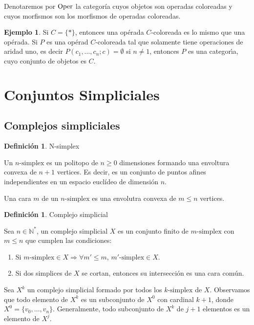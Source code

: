 \documentclass[11pt,a4paper,openright,oneside]{article}
\numberwithin{equation}{section}
\theoremstyle{definition}
\newtheorem{defi}[teo]{Definici\'on}
\newtheorem{ex}[teo]{Ejemplo}
\newcommand{\Oper}{\mathop{\rm Oper}}
\begin{document}
Denotaremos por $\Oper$ la categor\'ia cuyos objetos son operadas coloreadas y cuyos morfismos son los morfismos de operadas coloreadas.

\begin{ex}
    Si $C=\{*\}$, entonces una op\'erada $C$-coloreada es lo mismo que una op\'erada. Si $P$ es una op\'erad $C$-coloreada tal que solamente tiene operaciones de aridad uno, es decir $P(c_1,\ldots, c_n;c)=\emptyset$ si $n\ne 1$, entonces $P$ es una categor\'{\i}a, cuyo conjunto de objetos es $C$.
\end{ex}
\newpage


\section{Conjuntos Simpliciales}
\subsection{Complejos simpliciales}
\begin{defi}
    N-simplex
\end{defi}
Un $n\text{-simplex}$ es un politopo de $n\ge 0$ dimensiones formando una envoltura convexa de $n+1$ vertices. Es decir, es un conjunto de puntos afines independientes en un espacio eucl\'ideo de dimensi\'on $n$.

Una cara $m$ de un $n\text{-simplex}$ es una envolutra convexa de $m\le n$ vertices.

\begin{defi}
    Complejo simplicial
\end{defi}
Sea $n\in\mathbb{N}^{*}$, un complejo simplicial $X$ es un conjunto finito de $m\text{-simplex}$ con $m\le n$ que cumplen las condiciones:

\begin{enumerate}[(1)]
    \item Si $m\text{-simplex}\in X \Rightarrow \forall m'\le m\text{, }m'\text{-simplex}\in X$.
    \item Si dos simplices de $X$ se cortan, entonces su intersecci\'on es una cara com\'un.
\end{enumerate}

Sea $X^k$ un complejo simplicial formado por todos los $k\text{-simplex}$ de $X$. Observamos que todo elemento de $X^k$ es un subconjunto de $X^0$ con cardinal $k+1$, donde $X^0=\{v_0,\dots ,v_n\}$.
Generalmente, todo subconjunto de $X^k$ de $j+1$ elementos es un elemento de $X^j$.
\end{document}
